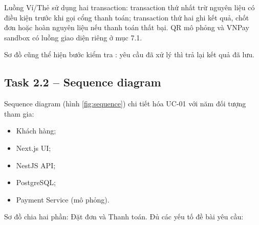 Luồng Ví/Thẻ sử dụng hai transaction: transaction thứ nhất trừ nguyên liệu có điều kiện trước khi gọi cổng thanh toán; transaction thứ hai ghi kết quả, chốt đơn hoặc hoàn nguyên liệu nếu thanh toán thất bại. QR mô phỏng và VNPay sandbox có luồng giao diện riêng ở mục 7.1.

Sơ đồ cũng thể hiện bước kiểm tra : yêu cầu đã xử lý thì trả lại kết quả đã lưu.


\subsection{Task 2.2 -- Sequence diagram}
Sequence diagram (hình \ref{fig:sequence}) chi tiết hóa UC-01 với năm đối tượng tham gia:
\begin{itemize}
\item Khách hàng;
\item Next.js UI;
\item NestJS API;
\item PostgreSQL;
\item Payment Service (mô phỏng).
\end{itemize}

Sơ đồ chia hai phần: Đặt đơn và Thanh toán. Đủ các yếu tố đề bài yêu cầu:

